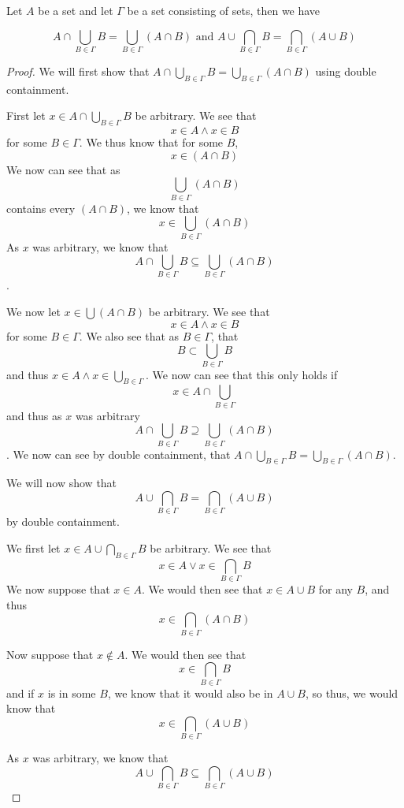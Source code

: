 \begin{majorEx}%
Let $A$ be a set and let $\Gamma$ be a set consisting of sets, then we have

	$$A \cap  \bigcup_{B\in \Gamma} B = \bigcup_{B\in \Gamma} (A \cap B)\text{  and  } A \cup \bigcap_{B\in \Gamma} B = \bigcap_{B\in \Gamma} (A \cup B)$$
\end{majorEx}
\begin{proof}
	We will first show that $A \cap \bigcup_{B\in \Gamma} B = \bigcup_{B\in \Gamma} (A \cap B)$ using double containment. 
    
    First let $x \in A \cap \bigcup_{B\in \Gamma} B$ be arbitrary. We see that $$x \in A \land x\in B$$ for some $B \in \Gamma$. 
    We thus know that for some $B$, $$x\in (A \cap B)$$ 
    We now can see that as $$\bigcup_{B\in \Gamma} (A \cap B)$$ contains every $(A \cap B)$, we know that $$x \in \bigcup_{B\in \Gamma} (A \cap B)$$ 
    As $x$ was arbitrary, we know that $$A \cap \bigcup_{B\in \Gamma} B \subseteq \bigcup_{B\in \Gamma} (A \cap B)$$. 
    
    We now let $x \in \bigcup (A \cap B)$ be arbitrary. 
    We see that $$x \in A \land x \in B$$ for some $B\in \Gamma$.
    We also see that as $B\in \Gamma$, that $$B \subset \bigcup_{B\in \Gamma} B$$ and thus $x \in A \land x \in \bigcup_{B\in \Gamma}$.
    We now can see that this only holds if $$x \in A \cap \bigcup_{B\in \Gamma}$$ and thus as $x$ was arbitrary $$A \cap \bigcup_{B\in \Gamma} B \supseteq \bigcup_{B\in \Gamma} (A \cap B)$$. 
    We now can see by double containment, that $A \cap \bigcup_{B\in \Gamma} B = \bigcup_{B\in \Gamma} (A \cap B)$.
    
    We will now show that $$A \cup \bigcap_{B\in \Gamma} B = \bigcap_{B\in \Gamma} (A \cup B)$$ by double containment.
    
    We first let $x \in A \cup \bigcap_{B\in \Gamma} B$ be arbitrary.
   	We see that $$x \in A \lor x \in \bigcap_{B\in \Gamma} B$$ 
    We now suppose that $x \in A$. We would then see that $x \in A \cup B$ for any $B$, and thus $$x \in \bigcap_{B\in \Gamma} (A \cap B)$$
    
    Now suppose that $x \notin A$. We would then see that $$x \in \bigcap_{B\in \Gamma} B$$ and if $x$ is in some $B$, we know that it would also be in $A \cup B$, so thus, we would know that $$x \in \bigcap_{B\in \Gamma} (A \cup B)$$
    
    As $x$ was arbitrary, we know that 
    $$A \cup \bigcap_{B\in \Gamma} B \subseteq \bigcap_{B\in \Gamma} (A \cup B)$$
    

\end{proof}
